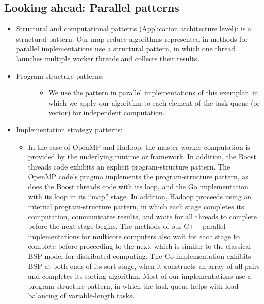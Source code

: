 \documentclass[letterpaper,10pt,openany,oneside]{sphinxmanual}
\begin{document}
\subsection{Looking ahead: Parallel patterns}
\label{evaluation/evaluation:looking-ahead-parallel-patterns}\begin{itemize}
\item {} 
Structural and computational patterns (Application architecture level):  is a structural pattern. Our map-reduce algorithms represented in  methods for parallel implementations use a  structural pattern, in which one thread launches multiple worker threads and collects their results.

\item {} \begin{description}
\item[{Program structure patterns:}] \leavevmode\begin{itemize}
\item {} 
We use the  pattern in parallel implementations of this exemplar, in which we apply our  algorithm to each element of the task queue (or vector) for independent computation.

\end{itemize}

\end{description}

\item {} 
Implementation strategy patterns:
\begin{itemize}
\item {} 
In the case of OpenMP and Hadoop, the master-worker computation is provided by the underlying runtime or framework. In addition, the Boost threads code exhibits an explicit  program-structure pattern. The OpenMP code’s  pragma implements the  program-structure pattern, as does the Boost threads code with its  loop, and the Go implementation with its  loop in its “map” stage. In addition, Hadoop proceeds using an internal  program-structure pattern, in which each stage completes its computation, communicates results, and waits for all threads to complete before the next stage begins. The  methods of our C++ parallel implementations for multicore computers also wait for each stage to complete before proceeding to the next, which is similar to the classical BSP model for distributed computing. The Go implementation exhibits BSP at both ends of its sort stage, when it constructs an array of all pairs and completes its sorting algorithm. Most of our implementations use a  program-structure pattern, in which the task queue helps with load balancing of variable-length tasks.


\end{itemize}
\end{itemize}
\end{document}
